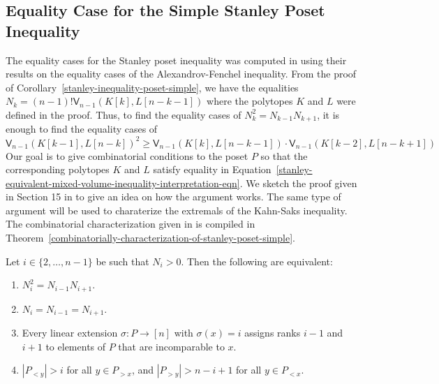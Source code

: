 \documentclass{puthesis-UG}
\begin{document}
\subsection{Equality Case for the Simple Stanley Poset Inequality}

The equality cases for the Stanley poset inequality was computed in \cite{shenfeld2022extremals} using their results on the equality cases of the Alexandrov-Fenchel inequality. From the proof of Corollary~\ref{stanley-inequality-poset-simple}, we have the equalities $N_k = (n-1)! \mathsf{V}_{n-1} (K[k], L[n-k-1])$ where the polytopes $K$ and $L$ were defined in the proof. Thus, to find the equality cases of $N_k^2 = N_{k-1} N_{k+1}$, it is enough to find the equality cases of 
\begin{equation} \label{stanley-equivalent-mixed-volume-inequality-interpretation-eqn}
	\mathsf{V}_{n-1}(K[k-1], L[n-k])^2 \geq \mathsf{V}_{n-1}(K[k], L[n-k-1]) \cdot \mathsf{V}_{n-1}(K[k-2], L[n-k+1])
\end{equation}
Our goal is to give combinatorial conditions to the poset $P$ so that the corresponding polytopes $K$ and $L$ satisfy equality in Equation~\ref{stanley-equivalent-mixed-volume-inequality-interpretation-eqn}. We sketch the proof given in Section 15 in \cite{shenfeld2022extremals} to give an idea on how the argument works. The same type of argument will be used to charaterize the extremals of the Kahn-Saks inequality. The combinatorial characterization given in \cite{shenfeld2022extremals} is compiled in Theorem~\ref{combinatorially-characterization-of-stanley-poset-simple}. 

\begin{thm} \label{combinatorially-characterization-of-stanley-poset-simple}
	Let $i \in \{2, \ldots, n-1\}$ be such that $N_i > 0$. Then the following are equivalent:
	\begin{enumerate}[label = (\alph*)]
		\item $N_i^2 = N_{i-1} N_{i+1}$. 
		\item $N_i = N_{i-1} = N_{i+1}$. 
		\item Every linear extension $\sigma : P \to [n]$ with $\sigma(x) = i$ assigns ranks $i-1$ and $i+1$ to elements of $P$ that are incomparable to $x$. 
		\item $|P_{< y}| > i$ for all $y \in P_{> x}$, and $|P_{> y}| > n-i+1$ for all $y \in P_{< x}$. 
	\end{enumerate}
\end{thm}
\end{document}
